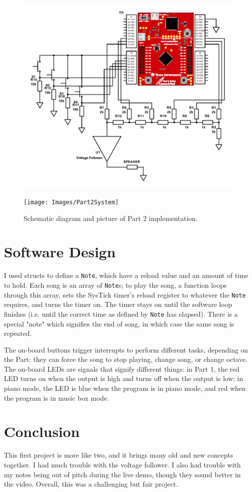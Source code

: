 \documentclass{article}
\renewcommand{\c}[1]{\texttt{#1}}
\begin{document}
\begin{figure}[H]
	\centering
	\includegraphics[width=\textwidth]{Images/Part2Schematic}

	\texttt{[image: Images/Part2System]}
	\caption{Schematic diagram and picture of Part 2 implementation.}
	\label{part 2 schematic and pic}
\end{figure}

\section{Software Design}
I used structs to define a \c{Note}, which have a reload value
and an amount of time to hold. Each song is an array of
\c{Note}s; to play the song, a function loops through this
array, sets the SysTick timer's reload register to whatever the
\c{Note} requires, and turns the timer on. The timer stays on
until the software loop finishes (i.e. until the correct time
as defined by \c{Note} has elapsed). There is a special "note"
which signifies the end of song, in which case the same song is
repeated.

The on-board buttons trigger interrupts to perform
different tasks, depending on the Part: they can force the
song to stop playing, change song, or change octave. The on-board
LEDs are signals that signify different things: in Part 1,
the red LED turns on when the output is high and turns off when
the output is low; in piano mode, the LED is blue when the program
is in piano mode, and red when the program is in music box mode.

\section{Conclusion}
This first project is more like two, and it brings many
old and new concepts together. I had much trouble with the
voltage follower. I also had trouble with my notes being out
of pitch during the live demo, though they sound better in
the video. Overall, this was a challenging but fair project.
\end{document}
